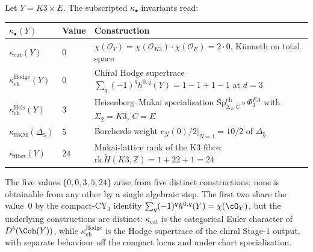 \begin{theorem}
\label{thm:four-kappa-k3xE-four-constructions}
Let $Y = K3 \times E$. The subscripted $\kappa_\bullet$ invariants read:
\begin{center}
\renewcommand{\arraystretch}{1.4}
\begin{tabular}{lll}
\hline
$\kappa_\bullet(Y)$ & Value & Construction \\
\hline
$\kappa_{\mathrm{cat}}(Y)$ & $0$ & $\chi(\mathcal{O}_Y) = \chi(\mathcal{O}_{K3}) \cdot \chi(\mathcal{O}_E) = 2 \cdot 0$, K\"unneth on total space \\
$\kappa_{\mathrm{ch}}^{\mathrm{Hodge}}(Y)$ & $0$ & Chiral Hodge supertrace $\sum_q (-1)^q h^{0, q}(Y) = 1 - 1 + 1 - 1$ at $d = 3$ \\
$\kappa_{\mathrm{ch}}^{\mathrm{Heis}}(Y)$ & $3$ & Heisenberg--Mukai specialisation $\mathrm{Sp}^{\mathrm{ch}}_{\Sigma_2, C} \circ \Phi^{FA}_3$ with $\Sigma_2 = K3$, $C = E$ \\
$\kappa_{\mathrm{BKM}}(\Delta_5)$ & $5$ & Borcherds weight $\left.c_N(0)/2\right|_{N=1} = 10/2$ of $\Delta_5$ \\
$\kappa_{\mathrm{fiber}}(Y)$ & $24$ & Mukai-lattice rank of the K3 fibre: $\mathrm{rk}\,\widetilde H(K3, \mathbb{Z}) = 1 + 22 + 1 = 24$ \\
\hline
\end{tabular}
\end{center}
The five values $\{0, 0, 3, 5, 24\}$ arise from five distinct constructions; none is obtainable from any other by a single algebraic step. The first two share the value~$0$ by the compact-CY$_3$ identity $\sum_q (-1)^q h^{0, q}(Y) = \chi(\cO_Y)$, but the underlying constructions are distinct: $\kappa_{\mathrm{cat}}$ is the categorical Euler character of $D^b(\Coh(Y))$, while $\kappa_{\mathrm{ch}}^{\mathrm{Hodge}}$ is the Hodge supertrace of the chiral Stage-$1$ output, with separate behaviour off the compact locus and under chart specialisation.
\end{theorem}

